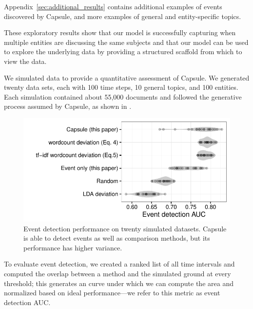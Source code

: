 Appendix~\ref{sec:additional_results} contains additional examples of events discovered by Capsule, and more examples of general and entity-specific topics.

These exploratory results show that our model is successfully capturing when multiple entities are discussing the same subjects and that our model can be used to explore the underlying data by providing a structured scaffold from which to view the data.

  We simulated data to provide a quantitative assessment of Capsule.
We generated twenty data sets, each with 100 time steps, 10 general topics, and 100 entities. Each simulation contained about 55,000 documents and followed the generative process assumed by Capsule, as shown in .

\begin{figure}[t]
\centering
\includegraphics[width=\linewidth]{fig/sim_eventdetect.pdf}
\caption{Event detection performance on twenty simulated datasets.  Capsule is able to detect events as well as comparison methods, but its performance has higher variance.}
\label{fig:sim_eventdetect}
\end{figure}

To evaluate event detection, we created a ranked list of all time intervals and computed the overlap between a method and the simulated ground at every threshold; this generates an curve under which we can compute the area and normalized based on ideal performance---we refer to this metric as event detection AUC. 

 
